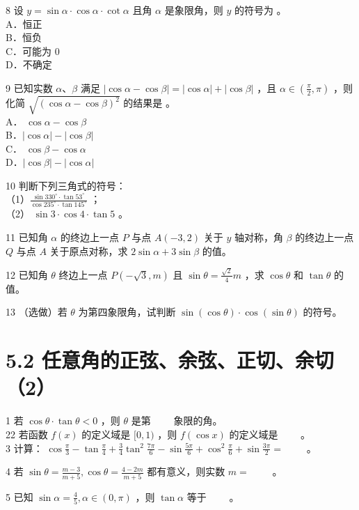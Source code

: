 \documentclass[10pt]{article}
\begin{document}
8 设 \(y=\sin \alpha \cdot \cos \alpha \cdot \cot \alpha\) 且角 \(\alpha\) 是象限角，则 \(y\) 的符号为 。\\
A．恒正\\
B．恒负\\
C．可能为 0\\
D．不确定

9 已知实数 \(\alpha 、 \beta\) 满足 \(|\cos \alpha-\cos \beta|=|\cos \alpha|+|\cos \beta|\) ，且 \(\alpha \in\left(\frac{\pi}{2}, \pi\right)\) ，则化简 \(\sqrt{(\cos \alpha-\cos \beta)^{2}}\) 的结果是 。\\
A． \(\cos \alpha-\cos \beta\)\\
B．\(|\cos \alpha|-|\cos \beta|\)\\
C． \(\cos \beta-\cos \alpha\)\\
D．\(|\cos \beta|-|\cos \alpha|\)

10 判断下列三角式的符号：\\
（1）\(\frac{\sin 330^{\circ} \cdot \tan 53^{\circ}}{\cos 235^{\circ} \cdot \tan 145^{\circ}}\) ；\\
（2） \(\sin 3 \cdot \cos 4 \cdot \tan 5\) 。

11 已知角 \(\alpha\) 的终边上一点 \(P\) 与点 \(A(-3,2)\) 关于 \(y\) 轴对称，角 \(\beta\) 的终边上一点 \(Q\) 与点 \(A\) 关于原点对称，求 \(2 \sin \alpha+3 \sin \beta\) 的值。

12 已知角 \(\theta\) 终边上一点 \(P(-\sqrt{3}, m)\) 且 \(\sin \theta=\frac{\sqrt{2}}{4} m\) ，求 \(\cos \theta\) 和 \(\tan \theta\) 的值。

13 （选做）若 \(\theta\) 为第四象限角，试判断 \(\sin (\cos \theta) \cdot \cos (\sin \theta)\) 的符号。

\section*{5.2 任意角的正弦、余弦、正切、余切（2）}
1 若 \(\cos \theta \cdot \tan \theta<0\) ，则 \(\theta\) 是第 \(\qquad\)象限的角。\\
22 若函数 \(f(x)\) 的定义域是 \([0,1)\) ，则 \(f(\cos x)\) 的定义域是 \(\qquad\)。\\
3 计算： \(\cos \frac{\pi}{3}-\tan \frac{\pi}{4}+\frac{3}{4} \tan ^{2} \frac{7 \pi}{6}-\sin \frac{5 \pi}{6}+\cos ^{2} \frac{\pi}{6}+\sin \frac{3 \pi}{2}=\) \(\qquad\)。

4 若 \(\sin \theta=\frac{m-3}{m+5}, \cos \theta=\frac{4-2 m}{m+5}\) 都有意义，则实数 \(m=\) \(\qquad\)。

5 已知 \(\sin \alpha=\frac{4}{5}, \alpha \in(0, \pi)\) ，则 \(\tan \alpha\) 等于 \(\qquad\)。
\end{document}
